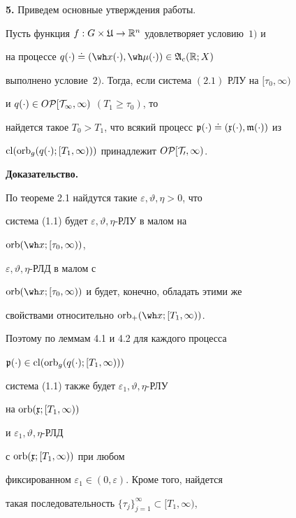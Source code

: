 {\bf 5.} Приведем основные утверждения работы.





\begin{thms}


Пусть функция $f:G\times\frak U\to\Bbb R^n$ удовлетворяет условию~$1)$ и


на процессе $q(\cdot)\doteq(\wh x(\cdot),\wh\mu(\cdot))


\in\frak A_{c}(\Bbb R;X)$


выполнено условие~$2)$. Тогда, если система $(2.1)$ РЛУ на $[\tau_0,\infty)$


и $q(\cdot)\in O\cal P[T_1,\infty)$ $(T_1\ge\tau_0)$, то


найдется такое $T_0>T_1$, что всякий процесс $\frak


p(\cdot)\doteq(\frak x(\cdot),\frak m(\cdot))$ из 


$\operatorname{cl}(\operatorname{orb}_g(q(\cdot);[T_1,\infty)))$ принадлежит $O\cal P[T_0,\infty)$.


\end{thms}








{\bf Доказательство.} 


По теореме 2.1 найдутся такие $\varepsilon,\vartheta,\eta>0$, что


система (1.1) будет $\varepsilon,\vartheta,\eta$-РЛУ в малом на


$\orb(\wh x;[\tau_0,\infty))$,


$\varepsilon,\vartheta,\eta$-РЛД в малом с


$\orb(\wh x;[\tau_0,\infty))$ и будет, конечно, обладать этими же 


свойствами относительно $\orb_+(\wh x;[T_1,\infty))$.


Поэтому по леммам 4.1 и 4.2 для каждого процесса


$\frak p(\cdot)\in\operatorname{cl}(\operatorname{orb}_g(q(\cdot);[T_1,\infty)))$


система (1.1) также будет $\varepsilon_1,\vartheta,\eta$-РЛУ


на $\operatorname{orb}(\frak x;[T_1,\infty))$


и $\varepsilon_1,\vartheta,\eta$-РЛД


с $\operatorname{orb}(\frak x;[T_1,\infty))$ при любом


фиксированном $\varepsilon_1\in(0,\varepsilon)$. Кроме того, найдется


такая последовательность $\{\tau_j\}_{j=1}^{\infty}\subset[T_1,\infty)$,


